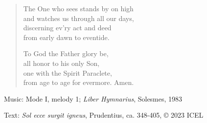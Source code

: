 \hymn



\setlength{\vleftmargin}{2em}
\begin{verse}
The One who sees stands by on high\\
and watches us through all our days,\\
discerning ev’ry act and deed\\
from early dawn to eventide.

To God the Father glory be,\\
all honor to his only Son,\\
one with the Spirit Paraclete,\\
from age to age for evermore. Amen.
\end{verse}

\begin{hymnsource}
Music: Mode I, melody 1; \emph{Liber Hymnarius}, Solesmes, 1983

Text: \emph{Sol ecce surgit igneus}, Prudentius, ca. 348-405, © 2023 ICEL
\end{hymnsource}
